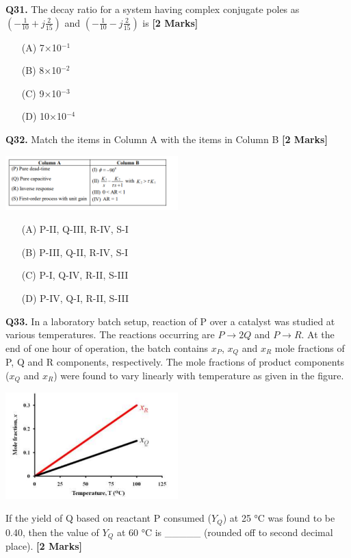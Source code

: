 \documentclass[11pt]{article}
\newcommand{\questionb}[2]{
    \noindent\textbf{Q#2.} #1 \hfill \textbf{[2 Marks]}
}
\begin{document}
\questionb{The decay ratio for a system having complex conjugate poles as \(\left( -\frac{1}{10} + j \frac{2}{15} \right)\) and \(\left( -\frac{1}{10} - j \frac{2}{15} \right)\) is}{31}
\begin{enumerate}
    \item[(A)] 7×10\(^{-1}\)  
    \item[(B)] 8×10\(^{-2}\)  
    \item[(C)] 9×10\(^{-3}\)  
    \item[(D)] 10×10\(^{-4}\)  
\end{enumerate}

\questionb{Match the items in Column A with the items in Column B}{32}
\begin{center}
\includegraphics[width=0.5\textwidth]{figures/Q32.png}
\end{center}
\begin{enumerate}
    \item[(A)] P-II, Q-III, R-IV, S-I  
    \item[(B)] P-III, Q-II, R-IV, S-I  
    \item[(C)] P-I, Q-IV, R-II, S-III  
    \item[(D)] P-IV, Q-I, R-II, S-III  
\end{enumerate}

\questionb{In a laboratory batch setup, reaction of P over a catalyst was studied at various temperatures. The reactions occurring are \(P \rightarrow 2Q\) and \(P \rightarrow R\). At the end of one hour of operation, the batch contains \(x_P\), \(x_Q\) and \(x_R\) mole fractions of P, Q and R components, respectively. The mole fractions of product components (\(x_Q\) and \(x_R\)) were found to vary linearly with temperature as given in the figure.
\begin{center}
\includegraphics[width=0.5\textwidth]{figures/Q33.png}
\end{center}
If the yield of Q based on reactant P consumed (\(Y_Q\)) at 25 °C was found to be 0.40, then the value of \(Y_Q\) at 60 °C is \_\_\_\_\_ (rounded off to second decimal place).}{33}
\vspace{0.5cm}
\end{document}
